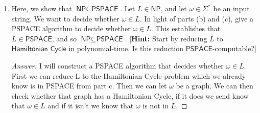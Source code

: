 \documentclass[11pt]{article}
\theoremstyle{definition}
\theoremstyle{definition}
\theoremstyle{definition}
\begin{document}
\begin{enumerate}[label=(\alph*)]
\begin{proof}[Answer]
\end{proof}




\vskip 15pt
\item Here, we show that $\textsf{NP} \subseteq \textsf{PSPACE}$. Let $L \in \textsf{NP}$, and let $\omega \in \Sigma^{*}$ be an input string. We want to decide whether $\omega \in L$. In light of parts (b) and (c), give a \textsf{PSPACE} algorithm to decide whether $\omega \in L$. This establishes that $L \in \textsf{PSPACE}$, and so $\textsf{NP} \subseteq \textsf{PSPACE}$.  [\textbf{Hint:} Start by reducing $L$ to $\textsf{Hamiltonian Cycle}$ in polynomial-time. Is this reduction $\textsf{PSPACE}$-computable?]

\begin{proof}[Answer]
I will construct a PSPACE algorithm that decides whether $\omega \in L$. First we can reduce L to the Hamiltonian Cycle problem  which we already know is in PSPACE from part c. Then we can let $\omega$ be a  graph. We can then check whether that graph has a Hamiltonian Cycle, if it does we send know that $\omega \in L$ and if it isn't we know that $\omega$ is not in $L$.

\end{proof}
 
\end{enumerate}
\end{document}
